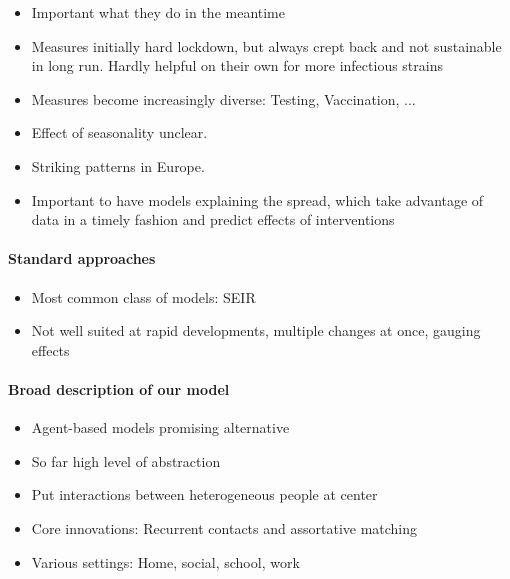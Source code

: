 \begin{itemize}
    \item Important what they do in the meantime
    \item Measures initially hard lockdown, but always crept back and not sustainable in long run. Hardly helpful on their own for more infectious strains
    \item Measures become increasingly diverse: Testing, Vaccination, ...
    \item Effect of seasonality unclear.
    \item Striking patterns in Europe. 
    \item Important to have models explaining the spread, which take advantage of data in a timely fashion and predict effects of interventions
\end{itemize}

\paragraph{Standard approaches }
\begin{itemize}
    \item Most common class of models: SEIR
    \item Not well suited at rapid developments, multiple changes at once, gauging effects
\end{itemize}

\paragraph{Broad description of our model}
\begin{itemize}
    \item Agent-based models promising alternative
    \item So far high level of abstraction
    \item Put interactions between heterogeneous people at center
    \item Core innovations: Recurrent contacts and assortative matching
    \item Various settings: Home, social, school, work
\end{itemize}

